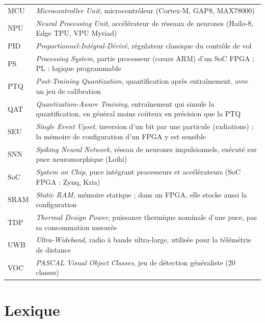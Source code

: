 {\begin{longtable}{@{}>{\raggedright\arraybackslash}p{2.2cm}>{\raggedright\arraybackslash}p{\dimexpr\linewidth-2.2cm-2\tabcolsep\relax}@{}}
\leavevmode\hypertarget{gl:MCU}{MCU} & \emph{Microcontroller Unit}, microcontrôleur (Cortex-M, GAP8, MAX78000) \\
\leavevmode\hypertarget{gl:NPU}{NPU} & \emph{Neural Processing Unit}, accélérateur de réseaux de neurones (Hailo-8, Edge TPU, VPU Myriad) \\
\leavevmode\hypertarget{gl:PID}{PID} & \emph{Proportionnel-Intégral-Dérivé}, régulateur classique du contrôle de vol \\
\leavevmode\hypertarget{gl:PS}{PS} & \emph{Processing System}, partie processeur (cœurs ARM) d'un SoC FPGA ; PL : logique programmable \\
\leavevmode\hypertarget{gl:PTQ}{PTQ} & \emph{Post-Training Quantization}, quantification après entraînement, avec un jeu de calibration \\
\leavevmode\hypertarget{gl:QAT}{QAT} & \emph{Quantization-Aware Training}, entraînement qui simule la quantification, en général moins coûteux en précision que la PTQ \\
\leavevmode\hypertarget{gl:SEU}{SEU} & \emph{Single Event Upset}, inversion d'un bit par une particule (radiations) ; la mémoire de configuration d'un FPGA y est sensible \\
\leavevmode\hypertarget{gl:SNN}{SNN} & \emph{Spiking Neural Network}, réseau de neurones impulsionnels, exécuté sur puce neuromorphique (Loihi) \\
\leavevmode\hypertarget{gl:SoC}{SoC} & \emph{System on Chip}, puce intégrant processeurs et accélérateurs (SoC FPGA : Zynq, Kria) \\
\leavevmode\hypertarget{gl:SRAM}{SRAM} & \emph{Static RAM}, mémoire statique ; dans un FPGA, elle stocke aussi la configuration \\
\leavevmode\hypertarget{gl:TDP}{TDP} & \emph{Thermal Design Power}, puissance thermique nominale d'une puce, pas sa consommation mesurée \\
\leavevmode\hypertarget{gl:UWB}{UWB} & \emph{Ultra-Wideband}, radio à bande ultra-large, utilisée pour la télémétrie de distance \\
\leavevmode\hypertarget{gl:VOC}{VOC} & \emph{PASCAL Visual Object Classes}, jeu de détection généraliste (20 classes) \\
\bottomrule
\end{longtable}}

\clearpage
\section{Lexique}
\label{sec:lexique}

